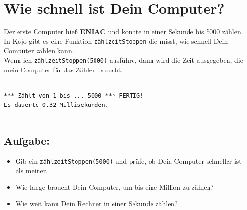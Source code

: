 \chapter{Wie schnell ist Dein Computer?}Der erste Computer hieß {\bf ENIAC} und konnte in einer Sekunde bis 5000 zählen.\\
In Kojo gibt es eine Funktion \lstinline{zählzeitStoppen} die misst, wie schnell Dein Computer zählen kann.\\
Wenn ich \lstinline{zählzeitStoppen(5000)} ausführe, dann wird die Zeit ausgegeben, die mein Computer für das Zählen braucht:

\begin{lstlisting}[numbers=none]

*** Zählt von 1 bis ... 5000 *** FERTIG!
Es dauerte 0.32 Millisekunden.
      
\end{lstlisting}
        
\section*{\color{BrickRed}Aufgabe:}


\begin{itemize}

\item {Gib ein \lstinline{zählzeitStoppen(5000)} und prüfe, ob Dein Computer schneller ist als meiner.}
\item {Wie lange braucht Dein Computer, um bis eine Million zu zählen?}
\item {Wie weit kann Dein Rechner in einer Sekunde zählen?}

\end{itemize}



